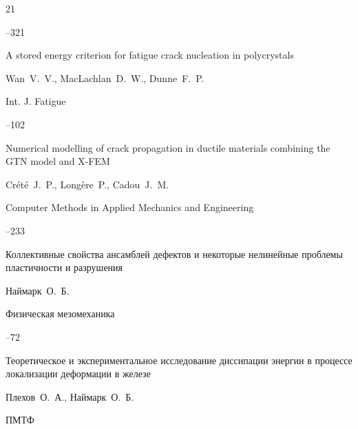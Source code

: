 \begin{thebibliography}{21}

--321





\paper A stored energy criterion for fatigue crack nucleation in polycrystals

\by Wan~V.~V., MacLachlan~D.~W., Dunne~F.~P.

\jour Int. J. Fatigue




--102




\paper Numerical modelling of crack propagation in ductile materials combining the GTN model and X-FEM

\by Cr\'et\'e~J.~P., Long\`ere~P., Cadou~J.~M.

\jour Computer Methods in Applied Mechanics and Engineering



--233





\paper Коллективные свойства ансамблей дефектов и некоторые нелинейные проблемы пластичности и разрушения

\by Наймарк~О.~Б.

\jour Физическая мезомеханика




--72




\paper Теоретическое и экспериментальное исследование диссипации энергии в процессе локализации деформации в железе

\by Плехов~О.~А., Наймарк~О.~Б.

\jour ПМТФ





\end{thebibliography}
